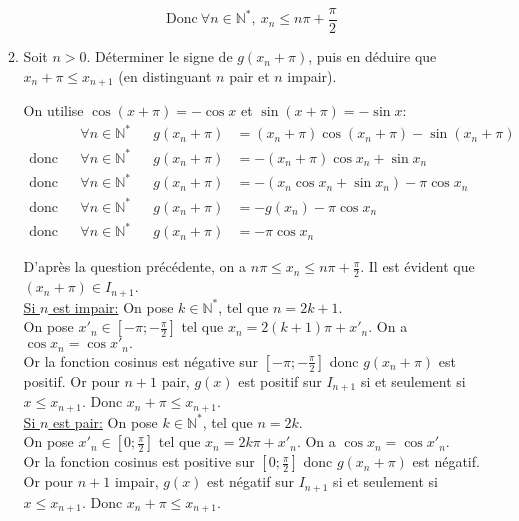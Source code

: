 \documentclass[a4paper,french,bookmarks]{article}
\begin{document}
\begin{enumerate}
\begin{enumerate}
\begin{tcolorbox}[colback=black!3,colframe=black!9,boxrule=.25pt,enhanced,arc is angular,arc=0pt]
        \[ \text{Donc} \ \forall n \in \mathbb{N}^*, \ x_n \leq n\pi + \dfrac{\pi}{2}\]
    \end{tcolorbox}
    \item Soit $n > 0$. Déterminer le signe de $g(x_n + \pi)$, puis en déduire que $x_n + \pi \leq x_{n+1}$ (en distinguant $n$ pair et $n$ impair).
        \begin{tcolorbox}[colback=black!3,colframe=black!9,boxrule=.25pt,enhanced,arc is angular,arc=0pt]
        On utilise $\cos\left(x + \pi\right) = -\cos x$ et $\sin\left(x + \pi\right) = -\sin x$:
        \begin{align*}
            && \forall n \in \mathbb{N}^* && g\left(x_n + \pi\right) &= \left(x_n + \pi\right)\cos\left(x_n + \pi\right) - \sin\left(x_n + \pi\right)\\
            \text{donc} && \forall n \in \mathbb{N}^* && g\left(x_n + \pi\right) &= -\left(x_n + \pi\right)\cos x_n + \sin x_n\\
            \text{donc} && \forall n \in \mathbb{N}^* && g\left(x_n + \pi\right) &= -\left(x_n\cos x_n + \sin x_n\right) - \pi\cos x_n\\
            \text{donc} && \forall n \in \mathbb{N}^* && g\left(x_n + \pi\right) &= -g(x_n) - \pi\cos x_n\\
            \text{donc} && \forall n \in \mathbb{N}^* && g\left(x_n + \pi\right) &= -\pi\cos x_n
        \end{align*}
        
        D'après la question précédente, on a $n\pi \leq x_n \leq n\pi + \frac{\pi}{2}$. Il est évident que $(x_n + \pi) \in I_{n+1}$.\\
        \underline{Si $n$ est impair:} On pose $k \in \mathbb{N}^*$, tel que $n=2k+1$.\\
        On pose $x'_n \in \left[-\pi;-\frac{\pi}{2}\right]$ tel que $x_n = 2(k+1)\pi + x'_n$. On a $\cos x_n = \cos x'_n.$\\
        Or la fonction cosinus est négative sur $ \left[-\pi;-\frac{\pi}{2}\right]$ donc $g\left(x_n + \pi\right)$ est positif. Or pour $n+1$ pair, $g(x)$ est positif sur $I_{n+1}$
        si et seulement si $x \leq x_{n+1}$. Donc $x_n + \pi \leq x_{n+1}$.\\
        
        \underline{Si $n$ est pair:} On pose $k \in \mathbb{N}^*$, tel que $n=2k$.\\
        On pose $x'_n \in \left[0;\frac{\pi}{2}\right]$ tel que $x_n = 2k\pi + x'_n$. On a $\cos x_n = \cos x'_n.$\\
        Or la fonction cosinus est positive sur $ \left[0;\frac{\pi}{2}\right]$ donc $g\left(x_n + \pi\right)$ est négatif.
        Or pour $n+1$ impair, $g(x)$ est négatif sur $I_{n+1}$ si et seulement si $x \leq x_{n+1}$. Donc $x_n + \pi \leq x_{n+1}$.
        

\end{tcolorbox}
\end{enumerate}
\end{enumerate}
\end{document}
